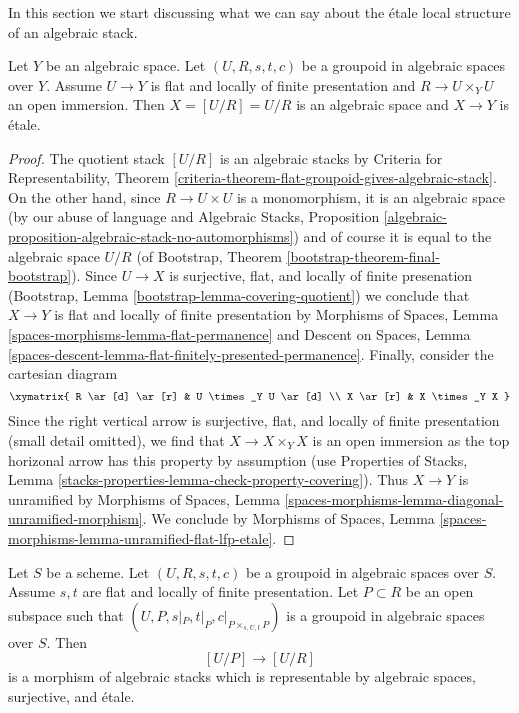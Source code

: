\noindent
In this section we start discussing what we can say
about the \'etale local structure of an algebraic stack.

\begin{lemma}
\label{lemma-quotient-etale}
Let $Y$ be an algebraic space.
Let $(U, R, s, t, c)$ be a groupoid in algebraic spaces over $Y$.
Assume $U \to Y$ is flat and locally of finite presentation
and $R \to U \times_Y U$ an open immersion.
Then $X = [U/R] = U/R$ is an algebraic space and $X \to Y$
is \'etale.
\end{lemma}

\begin{proof}
The quotient stack $[U/R]$ is an algebraic stacks by
Criteria for Representability, Theorem
\ref{criteria-theorem-flat-groupoid-gives-algebraic-stack}.
On the other hand, since $R \to U \times U$ is a monomorphism,
it is an algebraic space (by our abuse of language and
Algebraic Stacks, Proposition
\ref{algebraic-proposition-algebraic-stack-no-automorphisms})
and of course it is equal to the algebraic space $U/R$
(of Bootstrap, Theorem \ref{bootstrap-theorem-final-bootstrap}).
Since $U \to X$ is surjective, flat, and locally of finite presenation
(Bootstrap, Lemma \ref{bootstrap-lemma-covering-quotient})
we conclude that $X \to Y$ is flat and locally of finite presentation by
Morphisms of Spaces, Lemma \ref{spaces-morphisms-lemma-flat-permanence}
and
Descent on Spaces, Lemma
\ref{spaces-descent-lemma-flat-finitely-presented-permanence}.
Finally, consider the cartesian diagram
$$
\xymatrix{
R \ar[d] \ar[r] & U \times_Y U \ar[d] \\
X \ar[r] & X \times_Y X
}
$$
Since the right vertical arrow is surjective, flat, and
locally of finite presentation (small detail omitted), we
find that $X \to X \times_Y X$ is an open immersion as the top horizonal arrow
has this property by assumption (use
Properties of Stacks, Lemma
\ref{stacks-properties-lemma-check-property-covering}).
Thus $X \to Y$ is unramified by
Morphisms of Spaces, Lemma
\ref{spaces-morphisms-lemma-diagonal-unramified-morphism}.
We conclude by
Morphisms of Spaces, Lemma
\ref{spaces-morphisms-lemma-unramified-flat-lfp-etale}.
\end{proof}

\begin{lemma}
\label{lemma-quasi-splitting-etale}
Let $S$ be a scheme.
Let $(U, R, s, t, c)$ be a groupoid in algebraic spaces over $S$.
Assume $s, t$ are flat and locally of finite presentation.
Let $P \subset R$ be an open subspace such that
$(U, P, s|_P, t|_P, c|_{P \times_{s, U, t} P})$ is a
groupoid in algebraic spaces over $S$. Then
$$
[U/P] \longrightarrow [U/R]
$$
is a morphism of algebraic stacks which
is representable by algebraic spaces, surjective, and \'etale.
\end{lemma}

